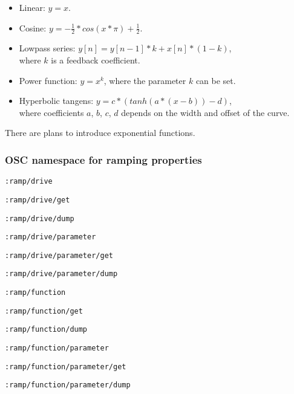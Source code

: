 \documentclass{sig-alternate}
\begin{document}
\begin{itemize}

	\item Linear: $y = x$.

	\item Cosine: $y = - \frac{1}{2} * cos(x * \pi ) + \frac{1}{2} $.

	\item Lowpass series: $y[n] = y[n-1] * k + x[n] * (1-k)$, \\ where $k$ is a feedback coefficient.

	\item Power function: $ y = x^{k} $, where the parameter $k$ can be set.

	\item Hyperbolic tangens: $ y = c * (tanh(a*(x-b)) - d) $, \\ where coefficients $a$, $b$, $c$, $d$ depends on the width and offset of the curve.
	
\end{itemize}

There are plans to introduce exponential functions.





\subsubsection{OSC namespace for ramping properties} %
\label{ssub:osc_namespace_for_ramping_properties}

\texttt{:ramp/drive}

\texttt{:ramp/drive/get}

\texttt{:ramp/drive/dump}



\texttt{:ramp/drive/parameter}

\texttt{:ramp/drive/parameter/get}

\texttt{:ramp/drive/parameter/dump}



\texttt{:ramp/function}

\texttt{:ramp/function/get}

\texttt{:ramp/function/dump}



\texttt{:ramp/function/parameter}

\texttt{:ramp/function/parameter/get}

\texttt{:ramp/function/parameter/dump}
\end{document}
